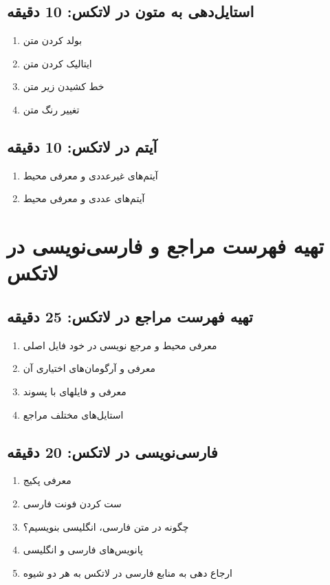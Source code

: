 \documentclass{article}
\begin{document}
\subsection*{استایل‌دهی به متون در لاتکس: 10 دقیقه}
\begin{enumerate}
\item بولد کردن متن
\item ایتالیک کردن متن
\item خط کشیدن زیر متن
\item تغییر رنگ متن
\end{enumerate}
\subsection*{آیتم در لاتکس: 10 دقیقه}
\begin{enumerate}
\item آیتم‌های غیرعددی و معرفی محیط 
\item آیتم‌های عددی و معرفی محیط 
\end{enumerate}



\section{تهیه فهرست مراجع و فارسی‌نویسی در لاتکس}
\subsection*{تهیه فهرست مراجع در لاتکس: 25 دقیقه}
\begin{enumerate}
\item معرفی محیط  و مرجع نویسی در خود فایل اصلی
\item معرفی  و آرگومان‌های اختیاری آن
\item معرفی  و فایلهای با پسوند 
\item استایل‌های مختلف مراجع
\end{enumerate}
\subsection*{فارسی‌نویسی در لاتکس: 20 دقیقه}
\begin{enumerate}
\item معرفی پکیج 
\item ست کردن فونت‌ فارسی
\item چگونه در متن فارسی، انگلیسی بنویسیم؟
\item پانویس‌های فارسی و انگلیسی
\item ارجاع دهی به منابع فارسی در لاتکس به هر دو شیوه
\end{enumerate}
\end{document}
